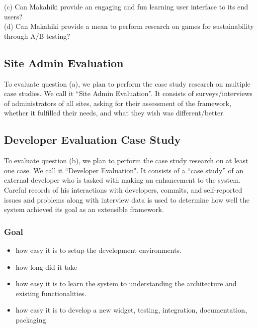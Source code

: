\documentclass[11pt,final]{article}
\begin{document}
         (c) Can Makahiki provide an engaging and fun learning user interface to its end users?\\

	(d) Can Makahiki provide a mean to perform research on games for sustainability through A/B testing?\\

\subsection{Site Admin Evaluation}
To evaluate question (a), we plan to perform the case study research on multiple case studies. We call it ``Site Admin Evaluation''. It consists of surveys/interviews of administrators of all sites, asking for their assessment of the framework, whether it fulfilled their needs, and what they wish was different/better.

\subsection{Developer Evaluation Case Study}
To evaluate question (b), we plan to perform the case study research on at least one case. We call it ``Developer Evaluation". It consists of a ``case study'' of an external developer who is tasked with making an enhancement to the system.  Careful records of his interactions with developers, commits, and self-reported issues and problems along with interview data is used to determine how well the system achieved its goal as an extensible framework.

\subsubsection{Goal}
\begin{itemize}
  \item how easy it is to setup the development environments.
 \item how long did it take
 \item how easy it is to learn the system to understanding the architecture and existing functionalities.
 \item how easy it is to develop a new widget, testing, integration, documentation, packaging
\end{itemize}
\end{document}
